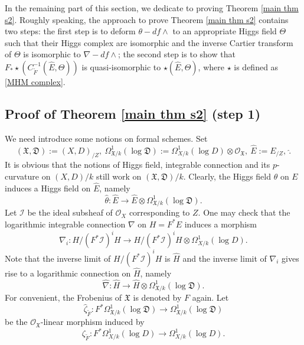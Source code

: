 \documentclass[12pt, a4paper]{article}
\begin{document}
In the remaining part of this section, we dedicate to proving Theorem \ref{main thm s2}. Roughly speaking, the approach to prove Theorem \ref{main thm s2} contains two steps: the first step is to deform $\theta-df\wedge$ to an appropriate Higgs field $\Theta$ such that their Higgs complex are isomorphic and the inverse Cartier transform of $\Theta$ is isomorphic to $\nabla-df\wedge$; the second step is to show that $F_*\star(C_{\tilde F}^{-1}(\hat E,\Theta))$ is quasi-isomorphic to $\star(\hat E,\Theta)$, where $\star$ is defined as \eqref{MHM complex}. 

\subsection{Proof of Theorem \ref{main thm s2} (step 1)}
We need introduce some notions on formal schemes. Set 
$$(\mathfrak X,\mathfrak D):=(X,D)_{/Z},~\Omega^1_{\mathfrak X/k}(\log\mathfrak D):=\Omega^1_{X/k}(\log D)\otimes\mathcal O_{\mathfrak X},~\hat E:=E_{/Z},~\hat .$$
It is obvious that the notions of Higgs field, integrable connection and its $p$-curvature on $(X,D)/k$ still work on $(\mathfrak X,\mathfrak D)/k$.
Clearly, the Higgs field $\theta$ on $E$ induces a Higgs field on $\hat E$, namely
$$
\hat\theta:\hat E\to\hat E\otimes\Omega^1_{\mathfrak X/k}(\log\mathfrak D).
$$
Let $\mathcal I$ be the ideal subsheaf of $\mathcal O_X$ corresponding to $Z$. One may check that the logarithmic integrable connection $\nabla$ on $H=F^*E$ induces a morphism
$$
\nabla_i:H/(F^*\mathcal I)^iH\to H/(F^*\mathcal I)^iH\otimes\Omega^1_{X/k}(\log D).
$$
Note that the inverse limit of $H/(F^*\mathcal I)^iH$ is $\hat H$ and the inverse limit of $\nabla_i$ gives rise to a logarithmic connection on $\hat H$, namely
$$
\hat\nabla:\hat H\to\hat H\otimes\Omega^1_{\mathfrak X/k}(\log\mathfrak D).
$$
For convenient, the Frobenius of $\mathfrak X$ is denoted by $F$ again. Let
$$
\hat{\zeta}_{\tilde F}:F^*\Omega^1_{\mathfrak X/k}(\log\mathfrak D)\to\Omega^1_{\mathfrak X/k}(\log\mathfrak D)
$$
be the $\mathcal O_{\mathfrak X}$-linear morphism induced by 
$$\zeta_{\tilde F}:F^*\Omega^1_{X/k}(\log D)\to\Omega^1_{X/k}(\log D).$$
\end{document}
